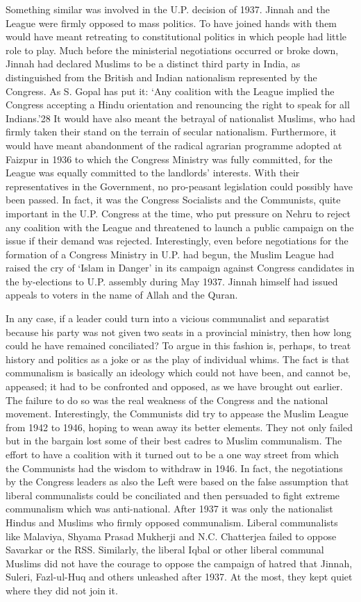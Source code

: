 Something similar was involved in the U.P. decision of 1937. Jinnah and the League were firmly opposed to mass politics. To have joined hands with them would have meant retreating to constitutional politics in which people had little role to play. Much before the ministerial negotiations occurred or broke down, Jinnah had declared Muslims to be a distinct third party in India, as distinguished from the British and Indian nationalism represented by the Congress. As S. Gopal has put it: ‘Any coalition with the League implied the Congress accepting a Hindu orientation and renouncing the right to speak for all Indians.’28 It would have also meant the betrayal of nationalist Muslims, who had firmly taken their stand on the terrain of secular nationalism. Furthermore, it would have meant abandonment of the radical agrarian programme adopted at Faizpur in 1936 to which the Congress Ministry was fully committed, for the League was equally committed to the landlords’ interests. With their representatives in the Government, no pro-peasant legislation could possibly have been passed. In fact, it was the Congress Socialists and the Communists, quite important in the U.P. Congress at the time, who put pressure on Nehru to reject any coalition with the League and threatened to launch a public campaign on the issue if their demand was rejected. Interestingly, even before negotiations for the formation of a Congress Ministry in U.P. had begun, the Muslim League had raised the cry of ‘Islam in Danger’ in its campaign against Congress candidates in the by-elections to U.P. assembly during May 1937. Jinnah himself had issued appeals to voters in the name of Allah and the Quran. 

In any case, if a leader could turn into a vicious communalist and separatist because his party was not given two seats in a provincial ministry, then how long could he have remained conciliated? To argue in this fashion is, perhaps, to treat history and politics as a joke or as the play of individual whims. The fact is that communalism is basically an ideology which could not have been, and cannot be, appeased; it had to be confronted and opposed, as we have brought out earlier. The failure to do so was the real weakness of the Congress and the national movement. Interestingly, the Communists did try to appease the Muslim League from 1942 to 1946, hoping to wean away its better elements. They not only failed but in the bargain lost some of their best cadres to Muslim communalism. The effort to have a coalition with it turned out to be a one way street from which the Communists had the wisdom to withdraw in 1946. In fact, the negotiations by the Congress leaders as also the Left were based on the false assumption that liberal communalists could be conciliated and then persuaded to fight extreme communalism which was anti-national. After 1937 it was only the nationalist Hindus and Muslims who firmly opposed communalism. Liberal communalists like Malaviya, Shyama Prasad Mukherji and N.C. Chatterjea failed to oppose Savarkar or the RSS. Similarly, the liberal Iqbal or other liberal communal Muslims did not have the courage to oppose the campaign of hatred that Jinnah, Suleri, Fazl-ul-Huq and others unleashed after 1937. At the most, they kept quiet where they did not join it. 


